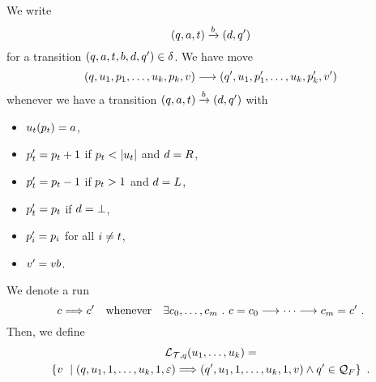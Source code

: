 We write
\[
    \left(q,a,t\right) \xrightarrow{b} \left(d,q'\right)
\]
for a transition
$\left(q, a, t, b, d, q'\right) \in \delta$.
We have move
\[
    \left(
        q,
        u_1, p_1,
        \ldots,
        u_k, p_k,
        v
    \right)
    \longrightarrow
    \left(
        q',
        u_1, p'_1,
        \ldots,
        u_k, p'_k,
        v'
    \right)
\]
whenever we have a transition
$\left(q,a,t\right) \xrightarrow{b} \left(d,q'\right)$
with
\begin{itemize}
\item
    ${u_t}\mathord{\left(p_t\right)} = a$,
\item
    $p'_t = p_t + 1$
        if $p_t < \left|u_t\right|$
        and $d = R$,
\item
    $p'_t = p_t - 1$
        if $p_t > 1$
        and $d = L$,
\item
    $p'_t = p_t$
        if $d = \bot$,
\item
    $p'_i = p_i$
        for all $i \neq t$,
\item
    $v' = v b$.
\end{itemize}
We denote a run
\[
    \tconfig \trun \tconfig'
    \quad
    \text{whenever}
    \quad
    \exists
        \tconfig_0, \ldots, \tconfig_\runlen \ .\ %
    \tconfig = \tconfig_0 \tmove \cdots \tmove \tconfig_\runlen = \tconfig' \ .
\]
Then, we define
\begin{multline*}
    {\mathcal{L}_{\mathcal{T},q}}\mathord{\left(u_1, \ldots, u_k\right)}
    = \\
    \left\{{v}\ \mid {
        \left(
            q,
            u_1, 1,
            \ldots,
            u_k, 1,
            \varepsilon
        \right)
        \Longrightarrow\left(
            q',
            u_1, 1,
            \ldots,
            u_k, 1,
            v\right)
        \land
        q' \in \mathcal{Q}_F}\right\} \ .
\end{multline*}

